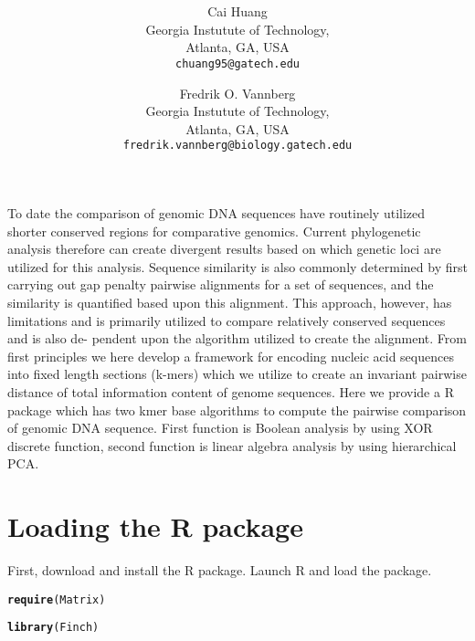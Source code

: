 \documentclass{article}\usepackage[]{graphicx}\usepackage[]{color}
\title{}
\title{\textsf{\textbf{\thetitle}}}
\author{
	Cai Huang\\[1em]Georgia Instutute of Technology,\\ Atlanta, GA, USA\\ \texttt{chuang95@gatech.edu}
	\and
	Fredrik O. Vannberg\\[1em]Georgia Instutute of Technology,\\ Atlanta, GA, USA\\ \texttt{fredrik.vannberg@biology.gatech.edu}
}
\makeatletter
\newcommand{\hlstd}[1]{\textcolor[rgb]{0.345,0.345,0.345}{#1}}%
\newcommand{\hlkwd}[1]{\textcolor[rgb]{0.737,0.353,0.396}{\textbf{#1}}}%
\newenvironment{kframe}{%
 \def\at@end@of@kframe{}%
 \ifinner\ifhmode%
  \def\at@end@of@kframe{\end{minipage}}%
  \begin{minipage}{\columnwidth}%
 \fi\fi%
 \def\FrameCommand##1{\hskip\@totalleftmargin \hskip-\fboxsep
 \colorbox{shadecolor}{##1}\hskip-\fboxsep
     \hskip-\linewidth \hskip-\@totalleftmargin \hskip\columnwidth}%
 \MakeFramed {\advance\hsize-\width
   \@totalleftmargin\z@ \linewidth\hsize
   \@setminipage}}%
 {\par\unskip\endMakeFramed%
 \at@end@of@kframe}
\newenvironment{knitrout}{}{} %
\makeatother
\begin{document}
\maketitle


\abstract

To date the comparison of genomic DNA sequences have routinely utilized shorter conserved regions for comparative genomics. Current phylogenetic analysis therefore can create divergent results based on which genetic loci are utilized for this analysis. Sequence similarity is also commonly determined by first carrying out gap penalty pairwise alignments for a set of sequences, and the similarity is quantified based upon this alignment. This approach, however, has limitations and is primarily utilized to compare relatively conserved sequences and is also de- pendent upon the algorithm utilized to create the alignment. From first principles we here develop a framework for encoding nucleic acid sequences into fixed length sections (k-mers) which we utilize to create an invariant pairwise distance of total information content of genome sequences. Here we provide a R package which has two kmer base algorithms to compute the pairwise comparison of genomic DNA sequence. First function is Boolean analysis by using XOR discrete function, second function is linear algebra analysis by using hierarchical PCA.


\tableofcontents


\section{Loading the R package}
\label{sec.loading}

First, download and install the  R package. Launch R and load the package.

\begin{knitrout}
\color{fgcolor}\begin{kframe}
\begin{alltt}
\hlkwd{require}\hlstd{(Matrix)}
\end{alltt}


{\ttfamily\noindent\itshape\color{messagecolor}{\#\# Loading required package: Matrix\\\#\# Loading required package: methods}}\begin{alltt}
\hlkwd{library}\hlstd{(Finch)}
\end{alltt}


{\ttfamily\noindent\bfseries\color{errorcolor}{\#\# Error in library(Finch): there is no package called 'Finch'}}\end{kframe}
\end{knitrout}
\end{document}
